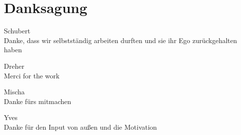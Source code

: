 \section{Danksagung}
Schubert
\\Danke, dass wir selbstständig arbeiten durften und sie ihr Ego zurückgehalten haben

Dreher
\\Merci for the work

Mischa
\\Danke fürs mitmachen

Yves
\\Danke für den Input von außen und die Motivation
